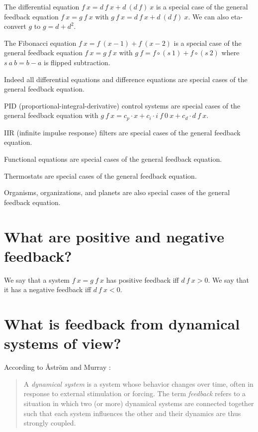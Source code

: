 The differential equation \( f~x = d~f~x + d~(d~f)~x \)
is a special case of the general feedback equation \( f~x = g~f~x \)
with \( g~f~x = d~f~x + d~(d~f)~x \).
We can also eta-convert \(g\) to \( g = d + d^2 \).

The Fibonacci equation \( f~x = f~(x-1) + f~(x-2) \)
is a special case of the general feedback equation \( f~x = g~f~x \)
with \( g~f = f \circ (s~1) + f \circ (s~2) \)
where \(s~a~b = b - a\) is flipped subtraction.

Indeed all differential equations and difference equations
are special cases of the general feedback equation.

PID (proportional-integral-derivative)
control systems are special cases of the general feedback equation
with \(g~f~x = c_p \cdot x + c_i \cdot i~f~0~x + c_d \cdot d~f~x\).

IIR (infinite impulse response) filters are special cases of the general feedback equation.

Functional equations are special cases of the general feedback equation.

Thermostats are special cases of the general feedback equation.

Organisms, organizations, and planets are
also special cases of the general feedback equation.

\section{What are positive and negative feedback?}

We say that a system \( f~x = g~f~x \) has positive feedback iff \( d~f~x > 0 \).
We say that it has a negative feedback iff \( d~f~x < 0 \).

\section{What is feedback from dynamical systems of view?}

According to \r{A}str\"om and Murray \cite{AstromMurrayFeedback}:
\begin{quote}
A \emph{dynamical system} is a system whose behavior changes over time, often in response
to external stimulation or forcing. The term \emph{feedback} refers to a situation in which
two (or more) dynamical systems are connected together such that each system
influences the other and their dynamics are thus strongly coupled.
\cite[p. 1]{AstromMurrayFeedback}
\end{quote}

